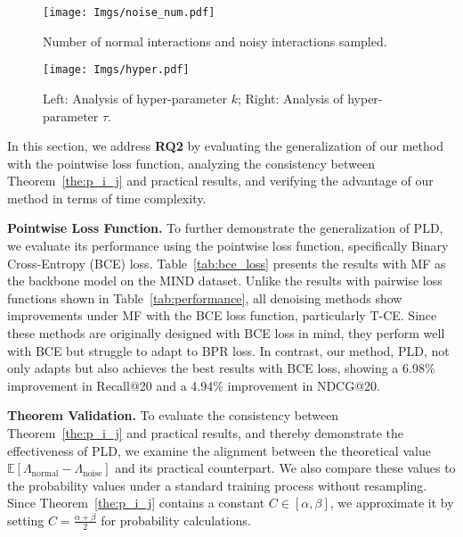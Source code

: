 

\begin{figure}
    \centering
    \texttt{[image: Imgs/noise\_num.pdf]}
    \caption{Number of normal interactions and noisy interactions sampled.}
    \label{fig:noise_num}
\end{figure}


\begin{figure*}[t]
    \centering
    \texttt{[image: Imgs/hyper.pdf]}
    \caption{Left: Analysis of hyper-parameter $k$; Right: Analysis of hyper-parameter $\tau$.}
    \label{fig:hyper}
\end{figure*}









In this section, we address \textbf{RQ2} by evaluating the generalization of our method with the pointwise loss function, analyzing the consistency between Theorem~\ref{the:p_i_j} and practical results, and verifying the advantage of our method in terms of time complexity.

\textbf{Pointwise Loss Function.}  
To further demonstrate the generalization of PLD, we evaluate its performance using the pointwise loss function, specifically Binary Cross-Entropy (BCE) loss. Table~\ref{tab:bce_loss} presents the results with MF as the backbone model on the MIND dataset. Unlike the results with pairwise loss functions shown in Table~\ref{tab:performance}, all denoising methods show improvements under MF with the BCE loss function, particularly T-CE. Since these methods are originally designed with BCE loss in mind, they perform well with BCE but struggle to adapt to BPR loss. In contrast, our method, PLD, not only adapts but also achieves the best results with BCE loss, showing a 6.98\% improvement in Recall@20 and a 4.94\% improvement in NDCG@20.


\textbf{Theorem Validation.}
To evaluate the consistency between Theorem~\ref{the:p_i_j} and practical results, and thereby demonstrate the effectiveness of PLD, we examine the alignment between the theoretical value $\mathbb{E}[\Lambda_{\text{normal}} - \Lambda_{\text{noise}}]$ and its practical counterpart. We also compare these values to the probability values under a standard training process without resampling. Since Theorem~\ref{the:p_i_j} contains a constant $C \in [\alpha, \beta]$, we approximate it by setting $C = \frac{\alpha + \beta}{2}$ for probability calculations.

